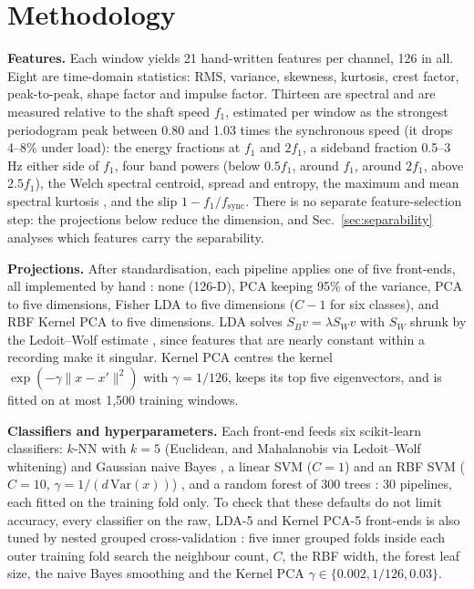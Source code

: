 
\section{Methodology}\label{sec:methods}

\textbf{Features.} Each window yields 21 hand-written features per channel, 126 in all. Eight
are time-domain statistics: RMS, variance, skewness, kurtosis, crest factor, peak-to-peak, shape
factor and impulse factor. Thirteen are spectral and are measured relative to the shaft speed
$f_1$, estimated per window as the strongest periodogram peak between 0.80 and 1.03 times the
synchronous speed (it drops 4--8\% under load): the energy fractions at $f_1$ and $2f_1$, a sideband fraction
0.5--3\,Hz either side of $f_1$, four band powers (below $0.5f_1$, around $f_1$, around $2f_1$,
above $2.5f_1$), the Welch \cite{welch1967} spectral centroid, spread and entropy, the maximum and
mean spectral kurtosis \cite{antoni2006}, and the slip $1 - f_1/f_\mathrm{sync}$. There is no separate feature-selection step:
the projections below reduce the dimension, and Sec.~\ref{sec:separability} analyses which
features carry the separability.

\textbf{Projections.} After standardisation, each pipeline applies one of five front-ends, all
implemented by hand \cite{duda2001}: none (126-D), PCA keeping 95\% of the variance, PCA to five dimensions,
Fisher LDA \cite{fisher1936} to five dimensions ($C-1$ for six classes), and RBF Kernel PCA to five dimensions.
LDA solves $S_B v = \lambda S_W v$ with $S_W$ shrunk by the Ledoit--Wolf estimate
\cite{ledoit2004}, since features that are nearly constant within a recording make it singular.
Kernel PCA \cite{scholkopf1998} centres the kernel $\exp(-\gamma\lVert x-x'\rVert^2)$ with
$\gamma = 1/126$, keeps its top five eigenvectors, and is fitted on at most 1{,}500 training
windows.

\textbf{Classifiers and hyperparameters.} Each front-end feeds six scikit-learn \cite{pedregosa2011}
classifiers: $k$-NN with $k=5$ (Euclidean, and Mahalanobis via Ledoit--Wolf whitening) and
Gaussian naive Bayes \cite{duda2001}, a linear SVM ($C=1$) and an RBF SVM ($C=10$,
$\gamma = 1/(d\,\mathrm{Var}(x))$) \cite{cortes1995}, and a random forest of 300 trees
\cite{breiman2001}: 30 pipelines, each fitted on the training fold only. To check that these defaults do not
limit accuracy, every classifier on the raw, LDA-5 and Kernel PCA-5 front-ends is also tuned by
nested grouped cross-validation \cite{cawley2010}: five inner grouped folds inside each outer
training fold search the neighbour count, $C$, the RBF width, the forest leaf size, the naive
Bayes smoothing and the Kernel PCA $\gamma \in \{0.002, 1/126, 0.03\}$.

